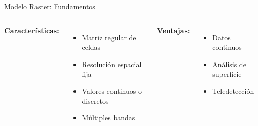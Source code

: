 \documentclass[10pt]{beamer}
\begin{document}
\begin{frame}{Modelo Raster: Fundamentos}
    \begin{columns}
        \textbf{Características:}
        \begin{itemize}
            \item Matriz regular de celdas
            \item Resolución espacial fija
            \item Valores continuos o discretos
            \item Múltiples bandas
        \end{itemize}
        
        \vspace{0.3cm}
        \textbf{Ventajas:}
        \begin{itemize}
            \item Datos continuos
            \item Análisis de superficie
            \item Teledetección
        \end{itemize}
        
    \end{columns}
\end{frame}
\end{document}
